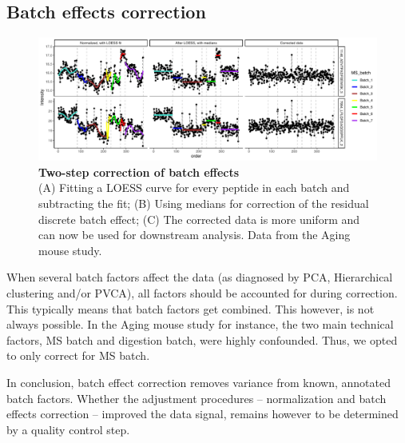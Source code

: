 \documentclass[num-refs]{wiley-article}
\begin{document}
\subsection{Batch effects correction}
\begin{figure}[hbt]
	\includegraphics[width=\textwidth]{figures/Fig5_batch_correction.pdf}
	
	\caption{\textbf{Two-step correction of batch effects}  \\
		\footnotesize
		(A) Fitting a LOESS curve for every peptide in each batch and subtracting the fit; (B) Using medians for correction of the residual discrete batch effect; (C) The corrected data is more uniform and can now be used for downstream analysis. Data from the Aging mouse study.}
	\label{fig:batch_fig5_batchCorrection}
\end{figure}

When several batch factors affect the data (as diagnosed by PCA, Hierarchical clustering and/or PVCA), all factors should be accounted for during correction. This typically means that batch factors get combined. This however, is not always possible. In the Aging mouse study for instance, the two main technical factors, MS batch and digestion batch, were highly confounded. Thus, we opted to only correct for MS batch.

In conclusion, batch effect correction removes variance from known, annotated batch factors. Whether the adjustment procedures – normalization and batch effects correction – improved the data signal, remains however to be determined by a quality control step.
\end{document}
